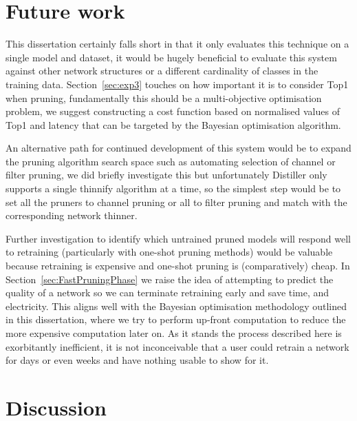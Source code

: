 \documentclass[../Dissertation.tex]{subfiles}
\begin{document}
\section{Future work}

This dissertation certainly falls short in that it only evaluates this technique on a single model and dataset, it would be hugely beneficial to evaluate this system against other network structures or a different cardinality of classes in the training data.
Section~\ref{sec:exp3} touches on how important it is to consider Top1 when pruning, fundamentally this should be a multi-objective optimisation problem, we suggest constructing a cost function based on normalised values of Top1 and latency that can be targeted by the Bayesian optimisation algorithm.

An alternative path for continued development of this system would be to expand the pruning algorithm search space such as automating selection of channel or filter pruning, we did briefly investigate this but unfortunately Distiller only supports a single thinnify algorithm at a time, so the simplest step would be to set all the pruners to channel pruning or all to filter pruning and match with the corresponding network thinner.

Further investigation to identify which untrained pruned models will respond well to retraining (particularly with one-shot pruning methods) would be valuable because retraining is expensive and one-shot pruning is (comparatively) cheap.
In Section~\ref{sec:FastPruningPhase} we raise the idea of attempting to predict the quality of a network so we can terminate retraining early and save time, and electricity.
This aligns well with the Bayesian optimisation methodology outlined in this dissertation, where we try to perform up-front computation to reduce the more expensive computation later on. 
As it stands the process described here is exorbitantly inefficient, it is not inconceivable that a user could retrain a network for days or even weeks and have nothing usable to show for it.

\section{Discussion}
\end{document}
